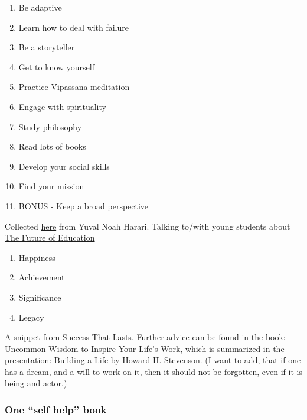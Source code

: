 \documentclass{article}
\begin{document}
\begin{minipage}[t]{0.45\textwidth}

\begin{enumerate}
    \item Be adaptive
    \item Learn how to deal with failure
    \item Be a storyteller
    \item Get to know yourself
    \item Practice Vipassana meditation
    \item Engage with spirituality
    \item Study philosophy
    \item Read lots of books
    \item Develop your social skills
    \item Find your mission
    \item BONUS - Keep a broad perspective
\end{enumerate}

Collected \href{https://www.youtube.com/watch?v=2tEgpgeErRg}{here} from Yuval Noah Harari.
Talking to/with young students about \href{https://www.youtube.com/watch?v=j0uw7Xc0fLk}{The Future of Education} 

\end{minipage}
\hfill
\begin{minipage}[t]{0.45\textwidth}


\begin{enumerate}
    \item Happiness
    \item Achievement
    \item Significance
    \item Legacy
\end{enumerate}

A snippet from
\href{https://hbr.org/2004/02/success-that-lasts}{Success That Lasts}.
Further advice can be found in  the book:
\href{https://www.goodreads.com/book/show/13538833-howard-s-gift}{Uncommon Wisdom to Inspire Your Life's Work}, which is summarized in the presentation:
\href{https://www.youtube.com/watch?v=wLn28DrSF68}{Building a Life by Howard H. Stevenson}.
(I want to add, that if one has a dream, and a will to work on it, then it should not be forgotten, even if it is being and actor.)

\end{minipage}

\subsubsection{One ``self help'' book}
\end{document}
